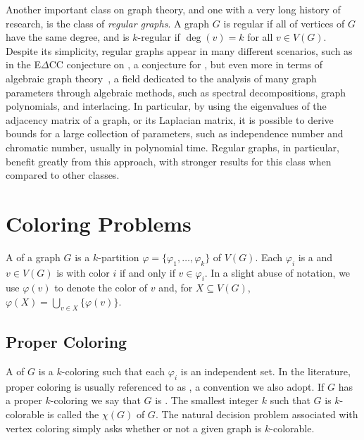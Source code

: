 Another important class on graph theory, and one with a very long history of research, is the class of \textit{regular graphs}.
A graph $G$ is regular if all of vertices of $G$ have the same degree, and is $k$-regular if $\deg(v) = k$ for all $v \in V(G)$.
Despite its simplicity, regular graphs appear in many different scenarios, such as in the E$\Delta$CC conjecture on , a conjecture for , but even more in terms of algebraic graph theory~\citep{godsil}, a field dedicated to the analysis of many graph parameters through algebraic methods, such as spectral decompositions, graph polynomials, and interlacing.
In particular, by using the eigenvalues of the adjacency matrix of a graph, or its Laplacian matrix, it is possible to derive bounds for a large collection of parameters, such as independence number and chromatic number, usually in polynomial time.
Regular graphs, in particular, benefit greatly from this approach, with stronger results for this class when compared to other classes.


\section{Coloring Problems}

A  of a graph $G$ is a $k$-partition $\varphi = \{\varphi_1, \dots,\varphi_k\}$ of $V(G)$.
Each $\varphi_i$ is a  and $v \in V(G)$ is  with color $i$ if and only if $v \in \varphi_i$.
In a slight abuse of notation, we use $\varphi(v)$ to denote the color of $v$ and, for $X \subseteq V(G)$, $\varphi(X) = \bigcup_{v \in X} \{\varphi(v)\}$.

\subsection{Proper Coloring}

A  of $G$ is a $k$-coloring such that each $\varphi_i$ is an independent set.
In the literature, proper coloring is usually referenced to as , a convention we also adopt.
If $G$ has a proper $k$-coloring we say that $G$ is .
The smallest integer $k$ such that $G$ is $k$-colorable is called the  $\chi(G)$ of $G$.
The natural decision problem associated with vertex coloring simply asks whether or not a given graph is $k$-colorable.



